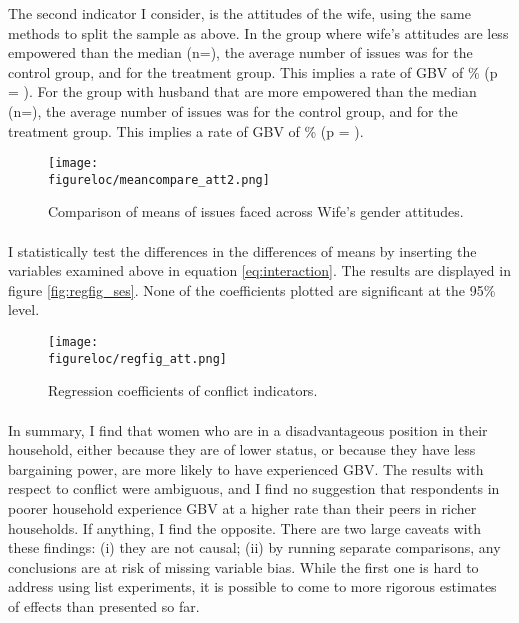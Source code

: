 \documentclass[11pt,a4paper]{scrartcl} %
\newcommand{\figureloc}{C:/Users/Koen/Dropbox/PhD/Papers/CongoGBV/Figures}
\begin{document}
The second indicator I consider, is the attitudes of the wife, using the same methods to split the sample as above. In the group where wife's attitudes are less empowered than the median (n=), the average number of issues was  for the control group, and  for the treatment group. This implies a rate of GBV of \% (p = ). For the group with husband that are more empowered than the median (n=), the average number of issues was  for the control group, and  for the treatment group. This implies a rate of GBV of \% (p = ).

\begin{figure}[H]
  \texttt{[image: \\figureloc/meancompare\_att2.png]}
  \caption{Comparison of means of issues faced across Wife's gender attitudes.}
  \label{fig:meancompare_att2}
\end{figure}

\paragraph{}
I statistically test the differences in the differences of means by inserting the variables examined above in equation \ref{eq:interaction}. The results are displayed in figure \ref{fig:regfig_ses}. None of the coefficients plotted are significant at the 95\% level.

\begin{figure}[H]
  \texttt{[image: \\figureloc/regfig\_att.png]}
  \caption{Regression coefficients of conflict indicators.}
  \label{fig:regfig_att}
\end{figure}


\paragraph{}
In summary, I find that women who are in a disadvantageous position in their household, either because they are of lower status, or because they have less bargaining power, are more likely to have experienced GBV. The results with respect to conflict were ambiguous, and I find no suggestion that respondents in poorer household experience GBV at a higher rate than their peers in richer households. If anything, I find the opposite. There are two large caveats with these findings: (i) they are not causal; (ii) by running separate comparisons, any conclusions are at risk of missing variable bias. While the first one is hard to address using list experiments, it is possible to come to more rigorous estimates of effects than presented so far. 
\end{document}
